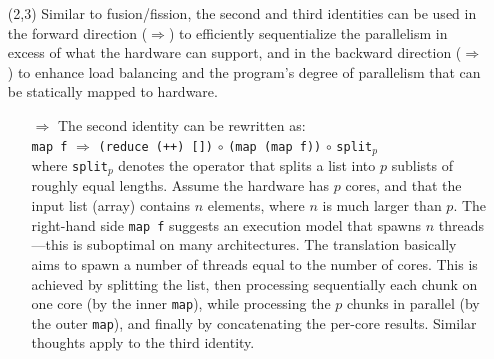 \documentclass[acmsmall,review]{acmart}\settopmatter{printfolios=true,printccs=false,printacmref=false}
\begin{document}
\begin{itemize}
    \item[(2,3)] Similar to fusion/fission, the second and third identities can 
                    be used in the forward 
                    direction ($\Rightarrow$) to efficiently sequentialize 
                    the parallelism in excess of what the hardware can support, 
                    and in the backward direction ($\Rightarrow$)  
                    to enhance load balancing and the program's degree of 
                    parallelism that can be statically mapped to hardware.
        \begin{itemize}
            \item[$\Rightarrow$]
                    The second identity can be rewritten as:\\
                    \lstinline{map f} $\Rightarrow$ \lstinline{(reduce (++) [])} $\circ$ \lstinline{(map (map f))} $\circ$ {\tt split$_p$}\\
                    where {\tt split$_p$} denotes the operator that splits a list
                    into $p$ sublists of roughly equal lengths.  Assume the hardware
                    has $p$ cores, and that the input list (array) contains
                    $n$ elements, where $n$ is much larger than $p$. The right-hand side 
                    \lstinline{map f} suggests an execution model that spawns $n$
                    threads---this is suboptimal on many architectures.
                    The translation basically aims to spawn a number of threads
                    equal to the number of cores. This is achieved by splitting
                    the list, then processing sequentially each chunk on one core
                    (by the inner \lstinline{map}), while processing the $p$ chunks 
                    in parallel (by the outer \lstinline{map}), and finally by
                    concatenating the per-core results. Similar thoughts apply to
                    the third identity.   
                    

\end{itemize}
\end{itemize}
\end{document}
